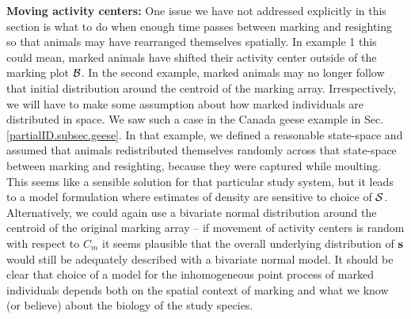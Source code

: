 {\flushleft \bf Moving activity centers:} One issue we have not addressed explicitly in this section is what to do when enough time passes between marking and resighting so that animals may have rearranged themselves spatially. In example 1 this could mean, marked animals have shifted their activity center outside of the marking plot ${\cal B}$. In the second example, marked animals may no longer follow that initial distribution around the centroid of the marking array. Irrespectively, we will have to make some assumption about how marked individuals are distributed in space. We saw such a case in the Canada geese example in Sec. \ref{partialID.subsec.geese}. In that example, we defined a reasonable state-space and assumed that animals redistributed themselves randomly across that state-space between marking and resighting, because they were captured while moulting. This seems like a sensible solution for that particular study system, but it leads to a model formulation where estimates of density are sensitive to choice of ${\cal S}$. Alternatively, we could again use a bivariate normal distribution around the centroid of the original marking array -- if movement of activity centers is random with respect to $C_m$ it seems plausible that the overall underlying distribution of $\bf s$ would still be adequately described with a bivariate normal model.
It should be clear that choice of a model for the inhomogeneous point process of marked individuals depends both on the spatial context of marking and what we know (or believe) about the biology of the study species.

